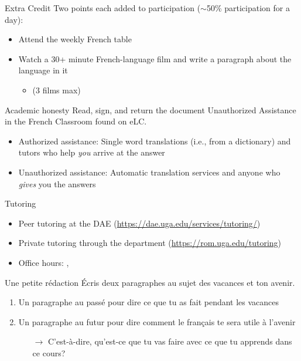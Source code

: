 \documentclass{beamer}
\begin{document}
  \begin{frame}{Extra Credit}
    Two points each added to participation ($\sim$50\% participation for a day):
    \begin{itemize}
      \item Attend the weekly French table
      \item Watch a 30+ minute French-language film and write a paragraph about the language in it
      \begin{itemize}
        \item (3 films max)
      \end{itemize}
    \end{itemize}
  \end{frame}

  \begin{frame}{Academic honesty}
    Read, sign, and return the document Unauthorized Assistance in the French Classroom found on eLC.
    \begin{itemize}
      \item Authorized assistance: Single word translations (i.e., from a dictionary) and tutors who help \emph{you} arrive at the answer
      \item Unauthorized assistance: Automatic translation services and anyone who \emph{gives} you the answers
    \end{itemize}
  \end{frame}

  \begin{frame}{Tutoring}
    \begin{itemize}
      \item Peer tutoring at the DAE (\url{https://dae.uga.edu/services/tutoring/})
      \item Private tutoring through the department (\url{https://rom.uga.edu/tutoring})
      \item Office hours: , 
    \end{itemize}
  \end{frame}

  \begin{frame}{Une petite rédaction}
    Écris deux paragraphes au sujet des vacances et ton avenir.
    \begin{enumerate}
      \item Un paragraphe \alert{au passé} pour dire ce que tu as fait pendant les vacances
      \item Un paragraphe \alert{au futur} pour dire comment le français te sera utile à l'avenir
      \begin{itemize}
        \item[$\to$] C'est-à-dire, qu'est-ce que tu vas faire avec ce que tu apprends dans ce cours?
      \end{itemize}
    \end{enumerate}
  \end{frame}
\end{document}

